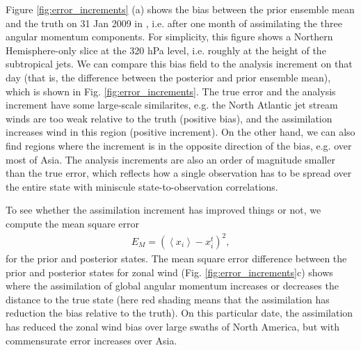 Figure \ref{fig:error_increments} (a) shows the bias between the prior ensemble mean and the truth on 31 Jan 2009 in \ERPALL, i.e. after one month of assimilating the three angular momentum components. 
For simplicity, this figure shows a Northern Hemisphere-only slice at the 320 hPa level, i.e. roughly at the height of the subtropical jets.
We can compare this bias field to the analysis increment on that day (that is, the difference between the posterior and prior ensemble mean), which is shown in Fig. \ref{fig:error_increments}.
The true error and the analysis increment have some large-scale similarites, e.g. the North Atlantic jet stream winds are too weak relative to the truth (positive bias), and the assimilation increases wind in this region (positive increment). 
On the other hand, we can also find regions where the increment is in the opposite direction of the bias, e.g. over most of Asia. 
The analysis increments are also an order of magnitude smaller than the true error, which reflects how a single observation has to be spread over the entire state with 
miniscule state-to-observation correlations.

To see whether the assimilation increment has improved things or not, we compute the mean square error
\begin{eqnarray}
	E_M = \left(
		\left< x_i \right>-x_{i}^{t}
	\right)^2,
\end{eqnarray}
for the prior and posterior states.
The mean square error difference between the prior and posterior states for zonal wind (Fig. \ref{fig:error_increments}c) shows where the assimilation of global angular momentum increases or decreases the distance to the true state (here red shading means that the assimilation has reduction the bias relative to the truth).  
On this particular date, the assimilation has reduced the zonal wind bias over large swaths of North America, but with commensurate error increases over Asia. 


